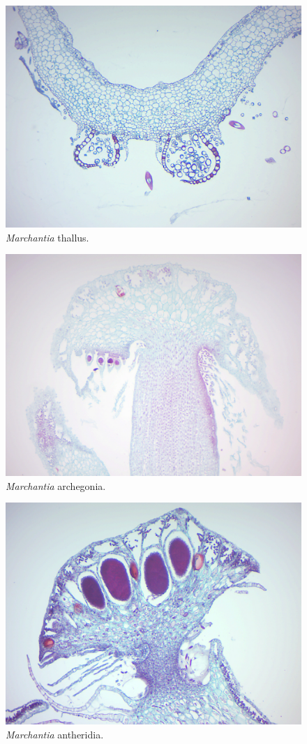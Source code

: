 \begin{figure}

{\centering \includegraphics[width=0.7\linewidth]{./figures/mosses/marchantia_thallus}

}

\caption{\emph{Marchantia} thallus.}\label{fig:marchantiathallus}
\end{figure}

\begin{figure}

{\centering \includegraphics[width=0.7\linewidth]{./figures/mosses/marchantia_archegonia}

}

\caption{\emph{Marchantia} archegonia.}\label{fig:marchantiaarchegonia}
\end{figure}

\begin{figure}

{\centering \includegraphics[width=0.7\linewidth]{./figures/mosses/marchantia_antheridia}

}

\caption{\emph{Marchantia} antheridia.}\label{fig:marchantiaantheridia}
\end{figure}

